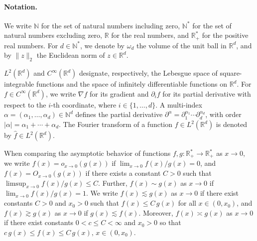 \documentclass[a4paper,12pt]{article}
\newcommand{\N}{\mathbb{N}}
\newcommand{\R}{\mathbb{R}}
\begin{document}

\paragraph{Notation.}
We write $\N$ for the set of natural numbers including zero,
$\N^*$ for the set of natural numbers excluding zero,
$\R$ for the real numbers, and $\R^*_+$ for the positive real numbers.
For $d \in \N^*$, we denote by $\omega_d$ the volume of the unit ball in $\R^d$,
and by $\|z\|_2$ the Euclidean norm of $z \in \R^d$.

$L^2(\R^d)$ and $C^\infty(\R^d)$ designate, respectively, the Lebesgue space of square-integrable functions and the space of infinitely differentiable functions on $\R^d$.
For $f \in C^\infty(\R^d)$, we write $\nabla f$ for its gradient and $\partial_i f$ for its partial derivative with respect to the $i$-th coordinate, where $i \in \{1,\dots,d\}$. A multi-index $\alpha = (\alpha_1,\dots,\alpha_d) \in \N^d$ defines the partial derivative
$\partial^\alpha = \partial_1^{\alpha_1} \cdots \partial_d^{\alpha_d}$,
with order $|\alpha| = \alpha_1 + \cdots + \alpha_d$.
The Fourier transform of a function $f \in L^2(\R^d)$ is denoted by $\hat f \in L^2(\R^d)$.

When comparing the asymptotic behavior of functions
$f,g \colon \R_+^* \to \R_+^*$ as $x \to 0$, we write
$f(x) = o_{x \to 0}(g(x))$ if $\lim_{x \to 0} f(x)/g(x) = 0$, and
$f(x) = O_{x \to 0}(g(x))$ if there exists a constant $C>0$ such that
$\limsup_{x \to 0} f(x)/g(x) \le C$.
Further, $f(x) \sim g(x)$ as $x \to 0$ if $\lim_{x \to 0} f(x)/g(x) = 1$.
We write $f(x) \lesssim g(x)$ as $x \to 0$ if there exist constants
$C>0$ and $x_0>0$ such that $f(x) \le C\, g(x)$ for all $x \in (0,x_0)$,
and $f(x) \gtrsim g(x)$ as $x \to 0$ if $g(x) \lesssim f(x)$.
Moreover, $f(x) \asymp g(x)$ as $x \to 0$
if there exist constants $0<c\le C<\infty$ and $x_0>0$ so that $
c\,g(x) \le f(x) \le C\,g(x), \, x \in (0,x_0)$.
\end{document}
